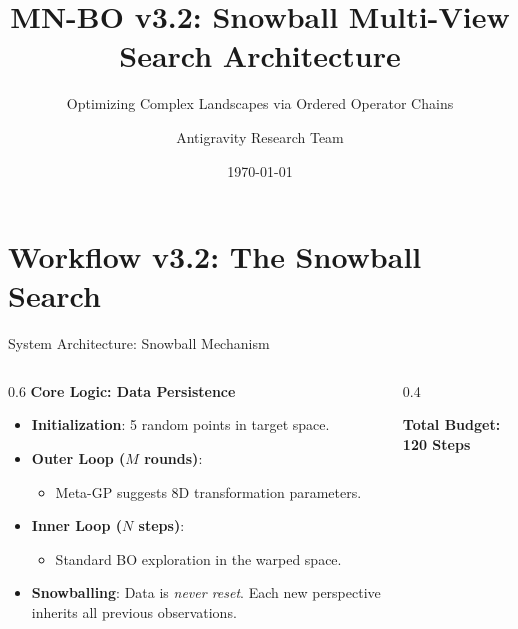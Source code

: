 \documentclass[10pt, aspectratio=169]{beamer}
\title{MN-BO v3.2: Snowball Multi-View Search Architecture}
\subtitle{Optimizing Complex Landscapes via Ordered Operator Chains}
\author{Antigravity Research Team}
\date{\today}
\begin{document}
\begin{frame}
    \titlepage
\end{frame}

\section{Workflow v3.2: The Snowball Search}

\begin{frame}{System Architecture: Snowball Mechanism}
    \begin{columns}
        \begin{column}{0.6\textwidth}
            \textbf{Core Logic: Data Persistence}
            \begin{itemize}
                \item \textbf{Initialization}: 5 random points in target space.
                \item \textbf{Outer Loop ($M$ rounds)}: 
                \begin{itemize}
                    \item Meta-GP suggests 8D transformation parameters.
                \end{itemize}
                \item \textbf{Inner Loop ($N$ steps)}: 
                \begin{itemize}
                    \item Standard BO exploration in the warped space.
                \end{itemize}
                \item \textbf{Snowballing}: Data is \textit{never reset}. Each new perspective inherits all previous observations.
            \end{itemize}
        \end{column}
        \begin{column}{0.4\textwidth}
            \vspace{0.5cm}
            \centering
            \textbf{Total Budget: 120 Steps}
        \end{column}
    \end{columns}
\end{frame}
\end{document}
